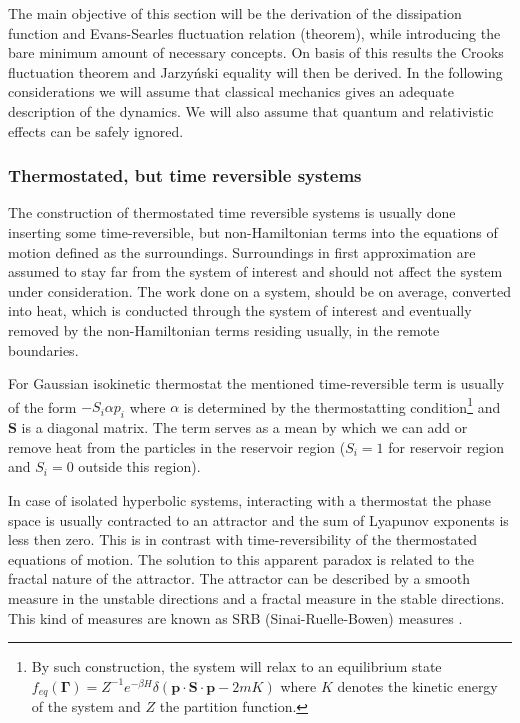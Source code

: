 \documentclass[a4paper,12pt]{article}
\begin{document}
The main objective of this section will be the derivation of the dissipation function and Evans-Searles fluctuation relation (theorem), while introducing the bare minimum amount of necessary concepts. On basis of this results the Crooks fluctuation theorem and Jarzyński equality will then be derived. In the following considerations we will assume that classical mechanics gives an adequate description of the dynamics. We will also assume that quantum and relativistic effects can be safely ignored.

\subsubsection{Thermostated, but time reversible systems}

The construction of thermostated time reversible systems is usually done inserting some time-reversible, but non-Hamiltonian terms into the equations of motion defined as the surroundings. Surroundings in first approximation are assumed to stay far from the system of interest and should not affect the system under consideration.
The work done on a system, should be on average, converted into heat, which is conducted through the system of interest and eventually removed by the non-Hamiltonian terms residing usually, in the remote boundaries.

For Gaussian isokinetic thermostat the mentioned time-reversible term is usually of the form $- S_i \alpha p_i $ where $\alpha$ is determined by the thermostatting condition\footnote{By such construction, the system will relax to an equilibrium state $f_{eq}(\bm{\Gamma})=Z^{-1} e^{-\beta H}\delta(\bm{p}\cdot \bm{S}\cdot \bm{p}-2m K)$ where $K$ denotes the kinetic energy of the system and $Z$ the partition function.}
 and $\textbf{S}$ is a diagonal matrix. The term serves as a mean by which we can add or remove heat from the particles in the reservoir region ($S_i =1$ for reservoir region and $S_i = 0$ outside this region).

In case of isolated hyperbolic systems, interacting with a thermostat the phase space is usually contracted to an attractor and the sum of Lyapunov exponents is less then zero.
This is in contrast with time-reversibility of the thermostated equations of motion. The solution to this apparent paradox is related to the fractal nature of the attractor.
The attractor can be described by a smooth measure in the unstable directions and a fractal measure in the stable directions.
This kind of measures are known as SRB (Sinai-Ruelle-Bowen) measures \cite{Dorfman:ozm67-zD}.
\end{document}

